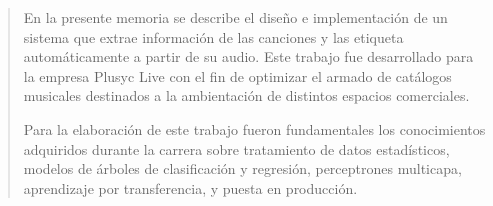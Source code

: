 \documentclass[
    11pt,
    spanish,
    singlespacing,
    parskip,
    headsepline,
    bookmarks=true,
    unicode=true,
    pdftoolbar=true,
    pdfmenubar=true,
    pdffitwindow=false,
    colorlinks=true,
    linkcolor=blue,
    citecolor=blue,
    urlcolor=blue
]{MastersDoctoralThesis}
\def\textbf#1{#1}%
\begin{document}



\frontmatter %
\pagestyle{plain} %


\begin{abstract}
\addchaptertocentry{\abstractname} %
En la presente memoria se describe el diseño e implementación de un sistema que extrae información de las canciones y las etiqueta automáticamente a partir de su audio. Este trabajo fue desarrollado para la empresa Plusyc Live con el fin de optimizar el armado de catálogos musicales destinados a la ambientación de distintos espacios comerciales.

Para la elaboración de este trabajo fueron fundamentales los conocimientos adquiridos durante la carrera sobre tratamiento de datos estadísticos, modelos de árboles de clasificación y regresión, perceptrones multicapa, aprendizaje por transferencia, y puesta en producción.
\end{abstract}

%


\tableofcontents
\listoffigures
\listoftables

\end{document}
